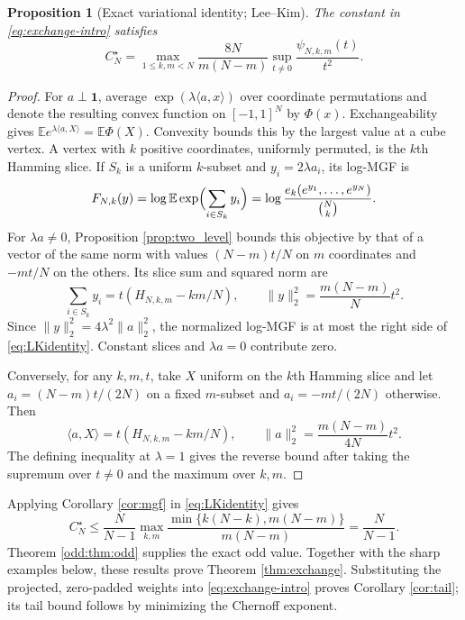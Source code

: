 \documentclass[11pt,a4paper]{article}
\newtheorem{proposition}[theorem]{Proposition}
\newcommand{\E}{\mathbb E}\newcommand{\R}{\mathbb R}\newcommand{\N}{\mathbb N}\newcommand{\one}{\mathbf1}
\begin{document}
\begin{proposition}[Exact variational identity; Lee--Kim]\label{prop:variational}
The constant in \eqref{eq:exchange-intro} satisfies
\begin{equation}\label{eq:LKidentity}
 \boxed{\quad C_N^\star=
 \max_{1\le k,m<N}\frac{8N}{m(N-m)}
 \sup_{t\ne0}\frac{\psi_{N,k,m}(t)}{t^2}.\quad}
\end{equation}
\end{proposition}
\begin{proof}
For $a\perp\one$, average $\exp(\lambda\langle a,x\rangle)$ over coordinate permutations and denote the resulting convex function on $[-1,1]^N$ by $\Phi(x)$. Exchangeability gives $\E e^{\lambda\langle a,X\rangle}=\E\Phi(X)$. Convexity bounds this by the largest value at a cube vertex. A vertex with $k$ positive coordinates, uniformly permuted, is the $k$th Hamming slice. If $S_k$ is a uniform $k$-subset and $y_i=2\lambda a_i$, its log-MGF is
\[
 F_{N,k}(y)=\log\E\exp\Bigl(\sum_{i\in S_k}y_i\Bigr)
 =\log\frac{e_k(e^{y_1},\ldots,e^{y_N})}{\binom Nk}.
\]
For $\lambda a\ne0$, Proposition \ref{prop:two_level} bounds this objective by that of a vector of the same norm with values $(N-m)t/N$ on $m$ coordinates and $-mt/N$ on the others. Its slice sum and squared norm are
\[
 \sum_{i\in S_k}y_i=t(H_{N,k,m}-km/N),\qquad
 \|y\|_2^2=\frac{m(N-m)}N t^2.
\]
Since $\|y\|_2^2=4\lambda^2\|a\|_2^2$, the normalized log-MGF is at most the right side of \eqref{eq:LKidentity}. Constant slices and $\lambda a=0$ contribute zero.

Conversely, for any $k,m,t$, take $X$ uniform on the $k$th Hamming slice and let $a_i=(N-m)t/(2N)$ on a fixed $m$-subset and $a_i=-mt/(2N)$ otherwise. Then
\[
 \langle a,X\rangle=t(H_{N,k,m}-km/N),\qquad
 \|a\|_2^2=\frac{m(N-m)}{4N}t^2.
\]
The defining inequality at $\lambda=1$ gives the reverse bound after taking the supremum over $t\ne0$ and the maximum over $k,m$.
\end{proof}

Applying Corollary \ref{cor:mgf} in \eqref{eq:LKidentity} gives
\begin{equation}\label{eq:globalC}
 C_N^\star\le\frac{N}{N-1}
 \max_{k,m}\frac{\min\{k(N-k),m(N-m)\}}{m(N-m)}
 =\frac{N}{N-1}.
\end{equation}
Theorem \ref{odd:thm:odd} supplies the exact odd value. Together with the sharp examples below, these results prove Theorem \ref{thm:exchange}. Substituting the projected, zero-padded weights into \eqref{eq:exchange-intro} proves Corollary \ref{cor:tail}; its tail bound follows by minimizing the Chernoff exponent.
\end{document}
